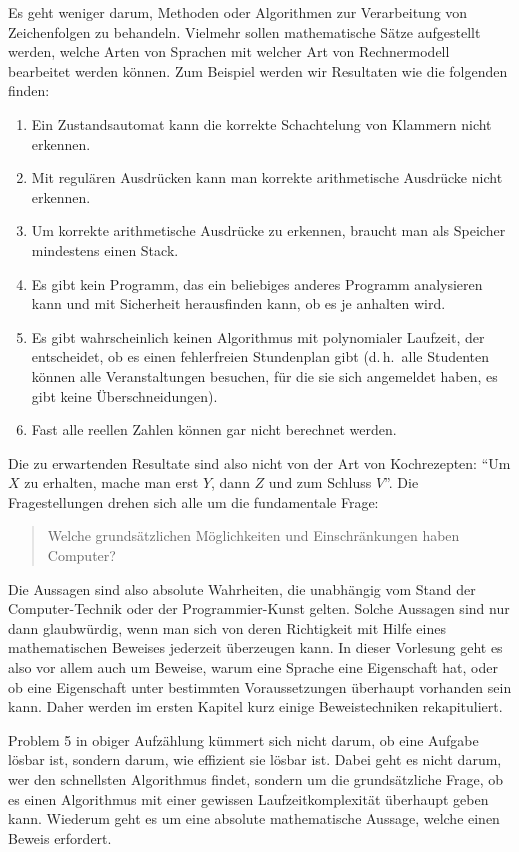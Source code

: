 Es geht weniger darum, Methoden oder Algorithmen zur Verarbeitung
von Zeichenfolgen zu behandeln.
Vielmehr sollen mathematische Sätze aufgestellt werden, welche
Arten von Sprachen mit welcher Art von Rechnermodell bearbeitet
werden können.
Zum Beispiel werden wir Resultaten wie die folgenden finden:
\begin{enumerate}
\item Ein Zustandsautomat kann die korrekte Schachtelung von
Klammern nicht erkennen.
\item Mit regulären Ausdrücken kann man korrekte arithmetische
Ausdrücke nicht erkennen.
\item Um korrekte arithmetische Ausdrücke zu erkennen, braucht man als
Speicher mindestens einen Stack.
\item Es gibt kein Programm, das ein beliebiges anderes Programm
analysieren kann und mit Sicherheit herausfinden kann, ob es je anhalten
wird.
\item Es gibt wahrscheinlich keinen Algorithmus mit polynomialer Laufzeit,
der entscheidet, ob es einen fehlerfreien Stundenplan gibt (d.\,h.~alle 
Studenten können alle Veranstaltungen besuchen, für die sie sich
angemeldet haben, es gibt keine Überschneidungen).
\item Fast alle reellen Zahlen können gar nicht berechnet werden.
\end{enumerate}
Die zu erwartenden Resultate sind also nicht von der Art von Kochrezepten:
``Um $X$ zu erhalten, mache man erst $Y$, dann $Z$ und zum Schluss $V$''.
Die Fragestellungen drehen sich alle um die fundamentale Frage:
\begin{quote}
Welche grundsätzlichen Möglichkeiten und Einschränkungen haben
Computer?
\end{quote}
Die Aussagen sind also absolute Wahrheiten, die unabhängig vom Stand
der Com\-pu\-ter-Technik oder der Programmier-Kunst gelten.
Solche Aussagen sind nur dann glaub\-würdig, wenn man sich von deren
Richtigkeit mit Hilfe eines mathematischen Beweises jederzeit überzeugen
kann. In dieser Vorlesung geht es also vor allem auch um Beweise, 
warum eine Sprache eine Eigenschaft hat, oder ob eine Eigenschaft
unter bestimmten Voraussetzungen überhaupt vorhanden sein kann.
Daher werden im ersten Kapitel kurz einige Beweistechniken rekapituliert.

Problem 5 in obiger Aufzählung kümmert sich nicht darum, ob eine
Aufgabe lösbar ist, sondern darum, wie effizient sie lösbar ist.
Dabei geht es nicht darum, wer den schnellsten Algorithmus findet,
sondern um die grundsätzliche Frage, ob es einen Algorithmus mit
einer gewissen Laufzeitkomplexität überhaupt geben kann.
Wiederum geht es um eine absolute mathematische Aussage, welche
einen Beweis erfordert. 

